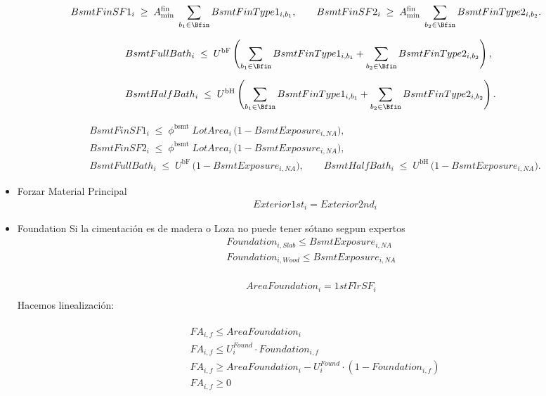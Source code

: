 \begin{itemize}
\begin{align}
& BsmtFinSF1_i \;\ge\; A^{\text{fin}}_{\min}\; \sum_{b_1\in \Bfin} BsmtFinType1_{i,b_1}, 
\qquad
  BsmtFinSF2_i \;\ge\; A^{\text{fin}}_{\min}\; \sum_{b_2\in \Bfin} BsmtFinType2_{i,b_2}. \label{eq:fin-min}
\end{align}

\begin{align}
& BsmtFullBath_i \;\le\; U^{\text{bF}} \left(
     \sum_{b_1\in \Bfin} BsmtFinType1_{i,b_1}
   + \sum_{b_2\in \Bfin} BsmtFinType2_{i,b_2} \right), \label{eq:bbath-full} \\[6pt]
& BsmtHalfBath_i \;\le\; U^{\text{bH}} \left(
     \sum_{b_1\in \Bfin} BsmtFinType1_{i,b_1}
   + \sum_{b_2\in \Bfin} BsmtFinType2_{i,b_2} \right). \label{eq:bbath-half}
\end{align}

\begin{align}
& BsmtFinSF1_i \;\le\; \phi^{\text{bsmt}}\; LotArea_i \,\big(1 - BsmtExposure_{i,NA}\big), \\[6pt]
& BsmtFinSF2_i \;\le\; \phi^{\text{bsmt}}\; LotArea_i \,\big(1 - BsmtExposure_{i,NA}\big), \\[6pt]
& BsmtFullBath_i \;\le\; U^{\text{bF}}\,\big(1 - BsmtExposure_{i,NA}\big), 
\qquad
  BsmtHalfBath_i \;\le\; U^{\text{bH}}\,\big(1 - BsmtExposure_{i,NA}\big).
\end{align}

    \item {Forzar Material Principal}
\begin{align}
    &Exterior1st_{i}=Exterior2nd_{i}
\end{align}


    \item {Foundation}
Si la cimentación es de madera o Loza no puede tener sótano segpun expertos\\
\begin{align}
    Foundation_{i,Slab}\leq BsmtExposure_{i,NA}\\
    Foundation_{i,Wood}\leq BsmtExposure_{i,NA}\\
\end{align}

\begin{align}
    AreaFoundation_{i}=1stFlrSF_{i}\\
    
\end{align}
Hacemos linealización:\\

\\
\begin{align}
    &FA_{i,f}\leq AreaFoundation_{i}\\
    &FA_{i,f}\leq U_{i}^{Found}\cdot Foundation_{i,f}\\
    &FA_{i,f}\geq AreaFoundation_{i} - U_{i}^{Found} \cdot (1-Foundation_{i,f})\\
    &FA_{i,f}\geq 0
\end{align}


\end{itemize}
